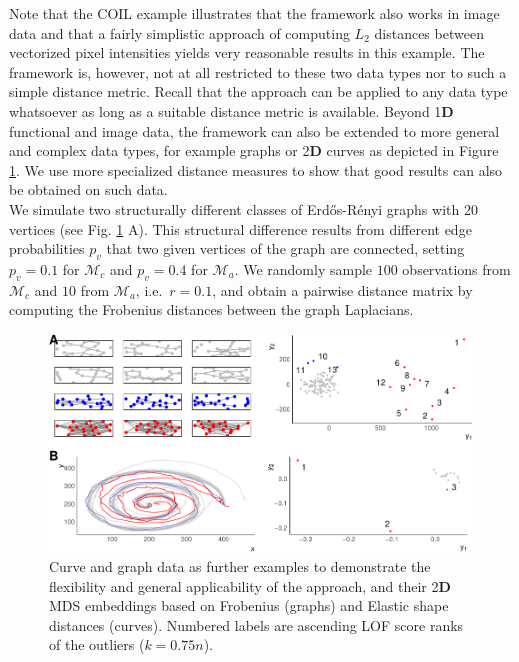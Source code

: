 \documentclass[
  10pt]{article}
\newcommand{\vizdim}{\mathbf{D}}        %
\newcommand{\co}{c}
\newcommand{\an}{a}
\newcommand{\Min}{\mathcal{M}_{\co}}
\newcommand{\Man}{\mathcal{M}_{\an}}
\begin{document}
Note that the COIL example illustrates that the framework also works in image data and that a fairly simplistic approach of computing \(L_2\) distances between vectorized pixel intensities yields very reasonable results in this example.
The framework is, however, not at all restricted to these two data types nor to such a simple distance metric. Recall that the approach can be applied to any data type whatsoever as long as a suitable distance metric is available. Beyond 1\(\vizdim\) functional and image data, the framework can also be extended to more general and complex data types, for example graphs or 2\(\vizdim\) curves as depicted in Figure \ref{fig:further-qual-exp}. We use more specialized distance measures to show that good results can also be obtained on such data.\\
We simulate two structurally different classes of Erd\H{o}s-Rényi graphs with 20 vertices (see Fig. \ref{fig:further-qual-exp} A). This structural difference results from different edge probabilities \(p_v\) that two given vertices of the graph are connected, setting \(p_{v} = 0.1\) for \(\Min\) and \(p_{v} = 0.4\) for \(\Man\). We randomly sample \(100\) observations from \(\Min\) and \(10\) from \(\Man\), i.e.~\(r = 0.1\), and obtain a pairwise distance matrix by computing the Frobenius distances between the graph Laplacians.

\begin{figure}
\centering
\includegraphics{00_paper_wires_files/figure-latex/further-qual-exp-1.pdf}
\caption{\label{fig:further-qual-exp}\label{fig:further-qual-exp} Curve and graph data as further examples to demonstrate the flexibility and general applicability of the approach, and their 2\(\vizdim\) MDS embeddings based on Frobenius (graphs) and Elastic shape distances (curves). Numbered labels are ascending LOF score ranks of the outliers (\(k = 0.75n\)).}
\end{figure}
\end{document}
